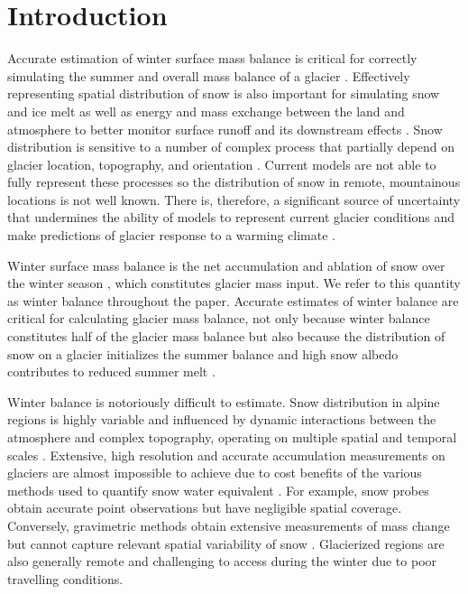 \documentclass[twocolumn, letterpaper]{igs}
\begin{document}
\section{Introduction}

Accurate estimation of winter surface mass balance is critical for correctly simulating the summer and overall mass balance of a glacier \citep{Reveillet2016}. Effectively representing spatial distribution of snow is also important for simulating snow and ice melt as well as energy and mass exchange between the land and atmosphere to better monitor surface runoff and its downstream effects \citep{Clark2011}. Snow distribution is sensitive to a number of complex process that partially depend on glacier location, topography, and orientation \citep{Bloschl1991, Mott2008, Clark2011, Sold2013}. Current models are not able to fully represent these processes so the distribution of snow in remote, mountainous locations is not well known. There is, therefore, a significant source of uncertainty that undermines the ability of models to represent current glacier conditions and make predictions of glacier response to a warming climate \citep{Reveillet2016}. 

Winter surface mass balance is the net accumulation and ablation of snow over the winter season \citep{Cogley2011}, which constitutes glacier mass input. We refer to this quantity as winter balance throughout the paper. Accurate estimates of winter balance are critical for calculating glacier mass balance, not only because winter balance constitutes half of the glacier mass balance but also because the distribution of snow on a glacier initializes the summer balance and high snow albedo contributes to reduced summer melt \citep{Hock2005, Reveillet2016}. 

Winter balance is notoriously difficult to estimate. Snow distribution in alpine regions is highly variable and influenced by dynamic interactions between the atmosphere and complex topography, operating on multiple spatial and temporal scales \citep{Barry1992, Liston2006, Clark2011}. Extensive, high resolution and accurate accumulation measurements on glaciers are almost impossible to achieve due to cost benefits of the various methods used to quantify snow water equivalent \citep{Cogley2011, McGrath2015}. For example, snow probes obtain accurate point observations but have negligible spatial coverage. Conversely, gravimetric methods obtain extensive measurements of mass change but cannot capture relevant spatial variability of snow \citep{Cogley2011}. Glacierized regions are also generally remote and challenging to access during the winter due to poor travelling conditions. 
\end{document}
